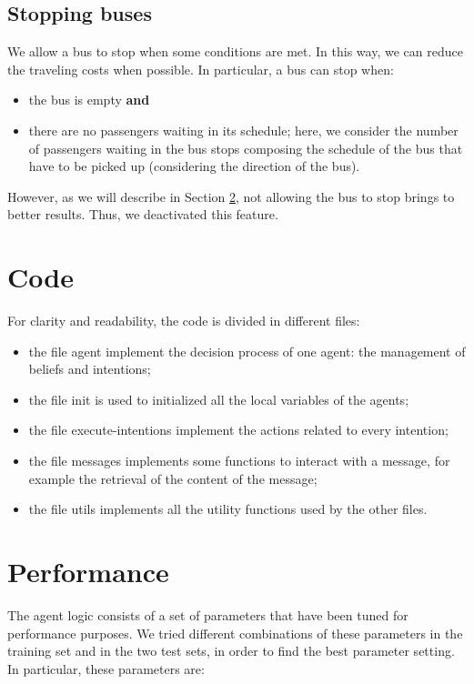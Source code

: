 \documentclass[a4paper]{article}
\begin{document}
\subsection{Stopping buses}
\label{sec:stop}
We allow a bus to stop when some conditions are met. In this way, we can reduce the traveling costs when possible. In particular, a bus can stop when:

\begin{itemize}
\item the bus is empty \textbf{and}
\item there are no passengers waiting in its schedule; here, we consider the number of passengers waiting in the bus stops composing the schedule of the bus that have to be picked up (considering the direction of the bus).
\end{itemize}

However, as we will describe in Section \ref{sec:tuning}, not allowing the bus to stop brings to better results. Thus, we deactivated this feature.

\section{Code}
For clarity and readability, the code is divided in different files:

\begin{itemize}
\item the file agent implement the decision process of one agent: the management of beliefs and intentions;
\item the file init is used to initialized all the local variables of the agents;
\item the file execute-intentions implement the actions related to every intention;
\item the file messages implements some functions to interact with a message, for example the retrieval of the content of the message;
\item the file utils implements all the utility functions used by the other files.
\end{itemize} 

\section{Performance}
\label{sec:tuning}
The agent logic consists of a set of parameters that have been tuned for performance purposes. We tried different combinations of these parameters in the training set and in the two test sets, in order to find the best parameter setting. In particular, these parameters are:
\end{document}
